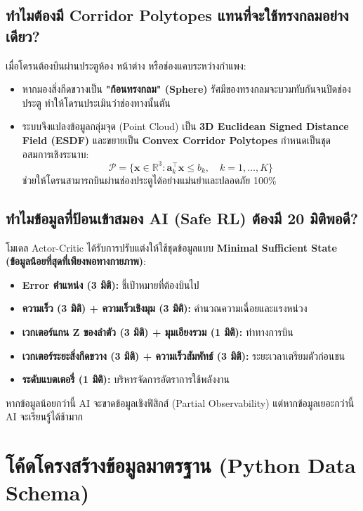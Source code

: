 \documentclass[11pt,a4paper]{article}
\begin{document}
\subsection{ทำไมต้องมี Corridor Polytopes แทนที่จะใช้ทรงกลมอย่างเดียว?}
เมื่อโดรนต้องบินผ่านประตูห้อง หน้าต่าง หรือช่องแคบระหว่างกำแพง:
\begin{itemize}[leftmargin=6mm]
    \item หากมองสิ่งกีดขวางเป็น \textbf{"ก้อนทรงกลม" (Sphere)} รัศมีของทรงกลมจะบวมทับกันจนปิดช่องประตู ทำให้โดรนประเมินว่าช่องทางนั้นตัน
    \item ระบบจึงแปลงข้อมูลกลุ่มจุด (Point Cloud) เป็น \textbf{3D Euclidean Signed Distance Field (ESDF)} และขยายเป็น \textbf{Convex Corridor Polytopes} กำหนดเป็นชุดอสมการเชิงระนาบ:
    \begin{equation}
        \mathcal{P} = \{\mathbf{x} \in \mathbb{R}^3 : \mathbf{a}_k^\top \mathbf{x} \le b_k, \quad k = 1, \dots, K\}
    \end{equation}
    ช่วยให้โดรนสามารถบินผ่านช่องประตูได้อย่างแม่นยำและปลอดภัย 100\%
\end{itemize}

\subsection{ทำไมข้อมูลที่ป้อนเข้าสมอง AI (Safe RL) ต้องมี 20 มิติพอดี?}
โมเดล Actor-Critic ได้รับการปรับแต่งให้ใช้ชุดข้อมูลแบบ \textbf{Minimal Sufficient State (ข้อมูลน้อยที่สุดที่เพียงพอทางกายภาพ)}:
\begin{itemize}[leftmargin=6mm]
    \item \textbf{Error ตำแหน่ง (3 มิติ):} ชี้เป้าหมายที่ต้องบินไป
    \item \textbf{ความเร็ว (3 มิติ) + ความเร็วเชิงมุม (3 มิติ):} คำนวณความเฉื่อยและแรงหน่วง
    \item \textbf{เวกเตอร์แกน Z ของลำตัว (3 มิติ) + มุมเอียงรวม (1 มิติ):} ท่าทางการบิน
    \item \textbf{เวกเตอร์ระยะสิ่งกีดขวาง (3 มิติ) + ความเร็วสัมพัทธ์ (3 มิติ):} ระยะเวลาเตรียมตัวก่อนชน
    \item \textbf{ระดับแบตเตอรี่ (1 มิติ):} บริหารจัดการอัตราการใช้พลังงาน
\end{itemize}
หากข้อมูลน้อยกว่านี้ AI จะขาดข้อมูลเชิงฟิสิกส์ (Partial Observability) แต่หากข้อมูลเยอะกว่านี้ AI จะเรียนรู้ได้ช้ามาก

\newpage

\section{โค้ดโครงสร้างข้อมูลมาตรฐาน (Python Data Schema)}
\end{document}
